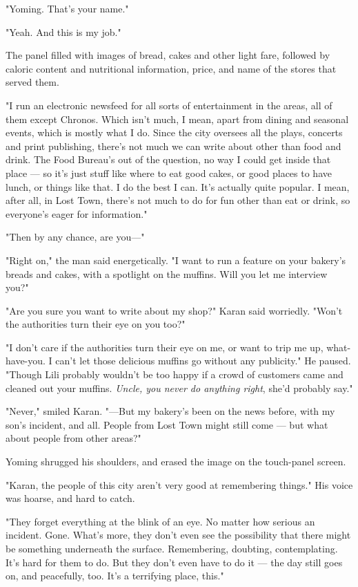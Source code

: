 "Yoming. That's your name."

"Yeah. And this is my job."

The panel filled with images of bread, cakes and other light fare,
followed by caloric content and nutritional information, price, and name
of the stores that served them.

"I run an electronic newsfeed for all sorts of entertainment in the
areas, all of them except Chronos. Which isn't much, I mean, apart from
dining and seasonal events, which is mostly what I do. Since the city
oversees all the plays, concerts and print publishing, there's not much
we can write about other than food and drink. The Food Bureau's out of
the question, no way I could get inside that place --- so it's just stuff
like where to eat good cakes, or good places to have lunch, or things
like that. I do the best I can. It's actually quite popular. I mean,
after all, in Lost Town, there's not much to do for fun other than eat
or drink, so everyone's eager for information."

"Then by any chance, are you---"

"Right on," the man said energetically. "I want to run a feature on your
bakery's breads and cakes, with a spotlight on the muffins. Will you let
me interview you?"

"Are you sure you want to write about my shop?" Karan said worriedly.
"Won't the authorities turn their eye on you too?"

"I don't care if the authorities turn their eye on me, or want to trip
me up, what-have-you. I can't let those delicious muffins go without any
publicity." He paused. "Though Lili probably wouldn't be too happy if a
crowd of customers came and cleaned out your muffins. \emph{Uncle, you never
do anything right}, she'd probably say."

"Never," smiled Karan. "---But my bakery's been on the news before, with
my son's incident, and all. People from Lost Town might still come --- but
what about people from other areas?"

Yoming shrugged his shoulders, and erased the image on the touch-panel
screen.

"Karan, the people of this city aren't very good at remembering things."
His voice was hoarse, and hard to catch.

"They forget everything at the blink of an eye. No matter how serious an
incident. Gone. What's more, they don't even see the possibility that
there might be something underneath the surface. Remembering, doubting,
contemplating. It's hard for them to do. But they don't even have to do
it --- the day still goes on, and peacefully, too. It's a terrifying
place, this."

